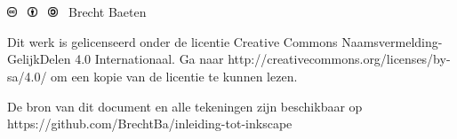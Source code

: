 \documentclass[t]{beamer}
\begin{document}
	\section*{}
	\begin{frame}
		\footnotesize
		\vspace{4cm}
		\includegraphics[height=0.3cm]{fig/cc} \
		\includegraphics[height=0.3cm]{fig/by} \
		\includegraphics[height=0.3cm]{fig/sa}
		\quad \the\year\ Brecht Baeten
		\vspace{0.5cm}
		
    	Dit werk is gelicenseerd onder de licentie Creative Commons Naamsvermelding-GelijkDelen 4.0 Internationaal. Ga naar http://creativecommons.org/licenses/by-sa/4.0/ om een kopie van de licentie te kunnen lezen.
    	
    	\vspace{0.5cm}
    	De bron van dit document en alle tekeningen zijn beschikbaar op https://github.com/BrechtBa/inleiding-tot-inkscape
	\end{frame}	
	
\end{document}
